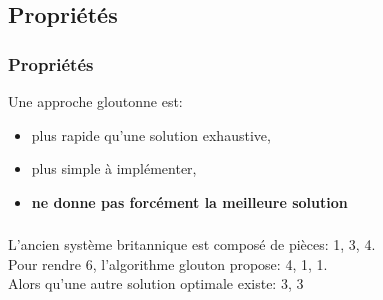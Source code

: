 \documentclass[svgnames,11pt]{beamer}
\begin{document}
\subsection{Propriétés}
\begin{frame}
    \frametitle{Propriétés}
Une approche gloutonne est:
    \begin{itemize}
        \item<1-> plus rapide qu'une solution exhaustive,
        \item<2-> plus simple à implémenter,
        \item<3-> \textbf{ne donne pas forcément la meilleure solution}
    \end{itemize}

\end{frame}
\begin{frame}
    \frametitle{}

L'ancien système britannique est composé de pièces: 1, 3, 4.\\
Pour rendre 6, l'algorithme glouton propose: 4, 1, 1.\\Alors qu'une autre solution optimale existe: 3, 3

\end{frame}
\end{document}
